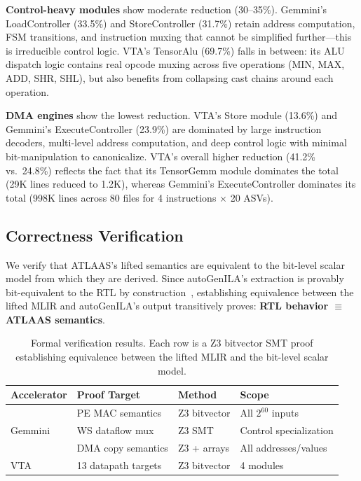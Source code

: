\textbf{Control-heavy modules} show moderate reduction (30--35\%).
Gemmini's LoadController (33.5\%) and StoreController (31.7\%) retain address computation, FSM transitions, and instruction muxing that cannot be simplified further---this is irreducible control logic.
VTA's TensorAlu (69.7\%) falls in between: its ALU dispatch logic contains real opcode muxing across five operations (MIN, MAX, ADD, SHR, SHL), but also benefits from collapsing cast chains around each operation.

\textbf{DMA engines} show the lowest reduction.
VTA's Store module (13.6\%) and Gemmini's ExecuteController (23.9\%) are dominated by large instruction decoders, multi-level address computation, and deep control logic with minimal bit-manipulation to canonicalize.
VTA's overall higher reduction (41.2\% vs.\ 24.8\%) reflects the fact that its TensorGemm module dominates the total (29K lines reduced to 1.2K), whereas Gemmini's ExecuteController dominates its total (998K lines across 80 files for 4 instructions $\times$ 20 ASVs).

\subsection{Correctness Verification}
\label{subsec:correctness}

We verify that ATLAAS's lifted semantics are equivalent to the bit-level scalar model from which they are derived.
Since autoGenILA's extraction is provably bit-equivalent to the RTL by construction~\cite{autogenilaiccad, autogeniladate}, establishing equivalence between the lifted MLIR and autoGenILA's output transitively proves: \textbf{RTL behavior $\equiv$ ATLAAS semantics}.

\begin{table}[t]
\centering
\caption{Formal verification results. Each row is a Z3 bitvector SMT proof establishing equivalence between the lifted MLIR and the bit-level scalar model.}
\label{tab:formal-verification}
\setlength{\tabcolsep}{3pt}
\scriptsize
\begin{tabular}{@{}l l l l@{}}
\toprule
Accelerator & Proof Target & Method & Scope \\
\midrule
\multirow{3}{*}{Gemmini}
  & PE MAC semantics     & Z3 bitvector  & All $2^{60}$ inputs \\
  & WS dataflow mux      & Z3 SMT        & Control specialization \\
  & DMA copy semantics   & Z3 + arrays   & All addresses/values \\
\midrule
VTA & 13 datapath targets & Z3 bitvector  & 4 modules \\
\bottomrule
\end{tabular}
\end{table}

